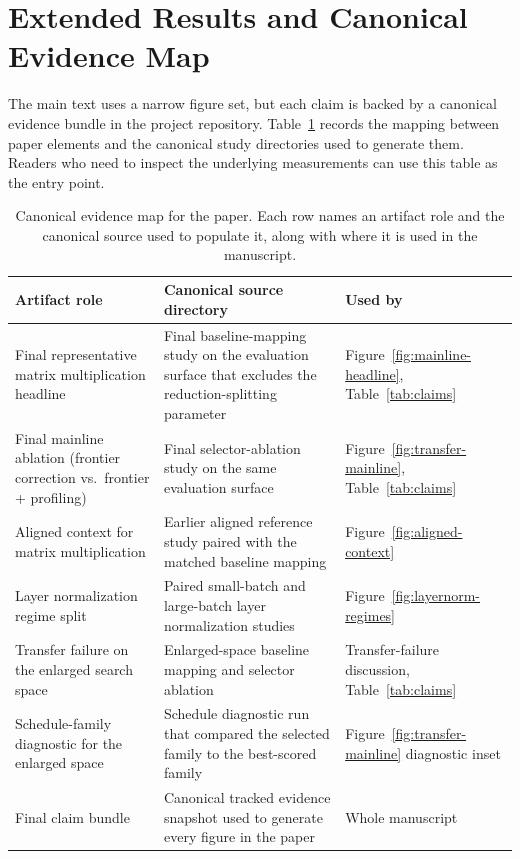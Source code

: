 \section{Extended Results and Canonical Evidence Map}

The main text uses a narrow figure set, but each claim is backed by a canonical evidence bundle in the project repository. Table~\ref{tab:artifactmap} records the mapping between paper elements and the canonical study directories used to generate them. Readers who need to inspect the underlying measurements can use this table as the entry point.

\begin{table}[t]
\centering
\small
\begin{tabular}{p{}p{}p{}}
\toprule
Artifact role & Canonical source directory & Used by \\
\midrule
Final representative matrix multiplication headline & Final baseline-mapping study on the evaluation surface that excludes the reduction-splitting parameter & Figure~\ref{fig:mainline-headline}, Table~\ref{tab:claims} \\
Final mainline ablation (frontier correction vs.\ frontier + profiling) & Final selector-ablation study on the same evaluation surface & Figure~\ref{fig:transfer-mainline}, Table~\ref{tab:claims} \\
Aligned context for matrix multiplication & Earlier aligned reference study paired with the matched baseline mapping & Figure~\ref{fig:aligned-context} \\
Layer normalization regime split & Paired small-batch and large-batch layer normalization studies & Figure~\ref{fig:layernorm-regimes} \\
Transfer failure on the enlarged search space & Enlarged-space baseline mapping and selector ablation & Transfer-failure discussion, Table~\ref{tab:claims} \\
Schedule-family diagnostic for the enlarged space & Schedule diagnostic run that compared the selected family to the best-scored family & Figure~\ref{fig:transfer-mainline} diagnostic inset \\
Final claim bundle & Canonical tracked evidence snapshot used to generate every figure in the paper & Whole manuscript \\
\bottomrule
\end{tabular}
\caption{Canonical evidence map for the paper. Each row names an artifact role and the canonical source used to populate it, along with where it is used in the manuscript.}
\label{tab:artifactmap}
\end{table}

